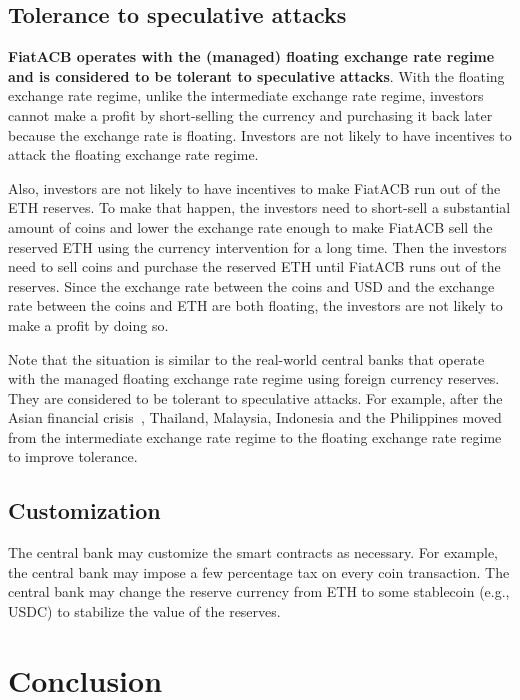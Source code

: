 \documentclass[dvipdfmx,a4paper]{article}
\begin{document}
\subsection{Tolerance to speculative attacks}

\textbf{FiatACB operates with the (managed) floating exchange rate regime and is considered to be tolerant to speculative attacks}. With the floating exchange rate regime, unlike the intermediate exchange rate regime, investors cannot make a profit by short-selling the currency and purchasing it back later because the exchange rate is floating. Investors are not likely to have incentives to attack the floating exchange rate regime.

Also, investors are not likely to have incentives to make FiatACB run out of the ETH reserves. To make that happen, the investors need to short-sell a substantial amount of coins and lower the exchange rate enough to make FiatACB sell the reserved ETH using the currency intervention for a long time. Then the investors need to sell coins and purchase the reserved ETH until FiatACB runs out of the reserves. Since the exchange rate between the coins and USD and the exchange rate between the coins and ETH are both floating, the investors are not likely to make a profit by doing so.

Note that the situation is similar to the real-world central banks that operate with the managed floating exchange rate regime using foreign currency reserves. They are considered to be tolerant to speculative attacks. For example, after the Asian financial crisis~\cite{radelet1998east}, Thailand, Malaysia, Indonesia and the Philippines moved from the intermediate exchange rate regime to the floating exchange rate regime to improve tolerance.

\subsection{Customization}

The central bank may customize the smart contracts as necessary. For example, the central bank may impose a few percentage tax on every coin transaction. The central bank may change the reserve currency from ETH to some stablecoin (e.g., USDC) to stabilize the value of the reserves.

\section{Conclusion}
\end{document}
